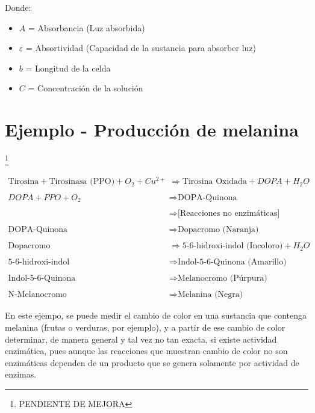 Donde:

\begin{itemize}
    \item $A$ = Absorbancia (Luz absorbida)
    \item $\varepsilon$ = Absortividad (Capacidad de la sustancia para absorber luz) 
    \item $b$ = Longitud de la celda
    \item $C$ = Concentración de la solución
\end{itemize}

\section{Ejemplo - Producción de melanina}\footnote{PENDIENTE DE MEJORA}

\begin{align*}
    \text{Tirosina} + \text{Tirosinasa (PPO)} + O_2 + Cu^{2+} &\Longrightarrow \text{Tirosina Oxidada} + DOPA + H_2O
    \\
    \\
    DOPA + PPO + O_2 &\Longrightarrow \text{DOPA-Quinona}
    \\
    \\
    &\Longrightarrow \text{[Reacciones no enzimáticas]}
    \\
    \\
    \text{DOPA-Quinona} &\Longrightarrow \text{Dopacromo (Naranja)}
    \\
    \\
    \text{Dopacromo} &\Longrightarrow \text{5-6-hidroxi-indol (Incoloro)} + H_2O
    \\
    \\
    \text{5-6-hidroxi-indol} &\Longrightarrow \text{Indol-5-6-Quinona (Amarillo)}
    \\
    \\
    \text{Indol-5-6-Quinona} &\Longrightarrow \text{Melanocromo (Púrpura)}
    \\
    \\
    \text{N-Melanocromo} &\Longrightarrow \text{Melanina (Negra)}
\end{align*}

En este ejempo, se puede medir el cambio de color en una sustancia que contenga melanina (frutas o verduras, por ejemplo), y a partir de ese cambio de color determinar, de manera general y tal vez no tan exacta, si existe actividad enzimática, pues aunque las reacciones que muestran cambio de color no son enzimáticas dependen de un producto que se genera solamente por actividad de enzimas.



\newpage \putbib